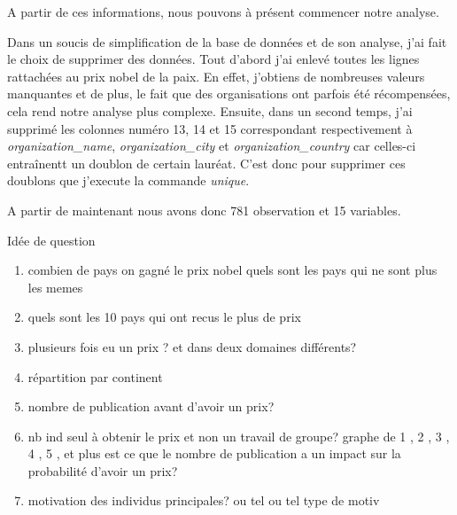 \documentclass[
]{article}
\newenvironment{Shaded}{\begin{snugshade}}{\end{snugshade}}
\newcommand{\CommentTok}[1]{\textcolor[rgb]{0.56,0.35,0.01}{\textit{#1}}}
\newcommand{\DecValTok}[1]{\textcolor[rgb]{0.00,0.00,0.81}{#1}}
\newcommand{\FunctionTok}[1]{\textcolor[rgb]{0.00,0.00,0.00}{#1}}
\newcommand{\NormalTok}[1]{#1}
\newcommand{\OtherTok}[1]{\textcolor[rgb]{0.56,0.35,0.01}{#1}}
\newcommand{\SpecialCharTok}[1]{\textcolor[rgb]{0.00,0.00,0.00}{#1}}
\newcommand{\StringTok}[1]{\textcolor[rgb]{0.31,0.60,0.02}{#1}}
\providecommand{\tightlist}{%
  \setlength{\itemsep}{0pt}\setlength{\parskip}{0pt}}
\begin{document}
A partir de ces informations, nous pouvons à présent commencer notre
analyse.

Dans un soucis de simplification de la base de données et de son
analyse, j'ai fait le choix de supprimer des données. Tout d'abord j'ai
enlevé toutes les lignes rattachées au prix nobel de la paix. En effet,
j'obtiens de nombreuses valeurs manquantes et de plus, le fait que des
organisations ont parfois été récompensées, cela rend notre analyse plus
complexe. Ensuite, dans un second temps, j'ai supprimé les colonnes
numéro 13, 14 et 15 correspondant respectivement à
\emph{organization\_name}, \emph{organization\_city} et
\emph{organization\_country} car celles-ci entraînentt un doublon de
certain lauréat. C'est donc pour supprimer ces doublons que j'execute la
commande \emph{unique}.

\begin{Shaded}
\end{Shaded}

A partir de maintenant nous avons donc 781 observation et 15 variables.

Idée de question

\begin{enumerate}
\def\labelenumi{\arabic{enumi}.}
\tightlist
\item
  combien de pays on gagné le prix nobel quels sont les pays qui ne sont
  plus les memes
\item
  quels sont les 10 pays qui ont recus le plus de prix
\item
  plusieurs fois eu un prix ? et dans deux domaines différents?
\item
  répartition par continent
\item
  nombre de publication avant d'avoir un prix?
\item
  nb ind seul à obtenir le prix et non un travail de groupe? graphe de 1
  , 2 , 3 , 4 , 5 , et plus est ce que le nombre de publication a un
  impact sur la probabilité d'avoir un prix?
\item
  motivation des individus principales? ou tel ou tel type de motiv
\end{enumerate}
\end{document}
